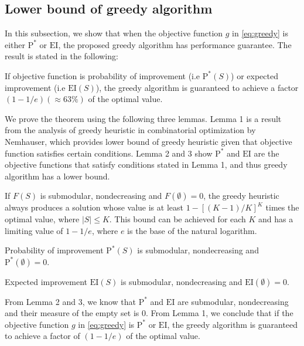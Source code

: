 \documentclass[opre,nonblindrev]{informs3} %
\newcommand{\EI}{\mathrm{EI}}
\newcommand{\PI}{\text{P}^*}
\begin{document}
\subsection{Lower bound of greedy algorithm}
In this subsection, we show that when the objective function $g$ in \eqref{eq:greedy} is either $\PI$ or $\EI$, the proposed greedy algorithm has performance guarantee. The result is stated in the following:
\begin{theorem} 
If objective function is probability of improvement (i.e $\PI(S)$) or expected improvement (i.e $\EI(S)$), the greedy algorithm is guaranteed to achieve a factor $(1-1/e) (\approx 63\%)$ of the optimal value.
\end{theorem}
We prove the theorem using the following three lemmas. Lemma 1 is a result from the analysis of greedy heuristic in combinatorial optimization by Nemhauser, which provides lower bound of greedy heuristic given that objective function satisfies certain conditions. Lemma 2 and 3 show $\PI$ and $\EI$ are the objective functions that satisfy conditions stated in Lemma 1, and thus greedy algorithm has a lower bound.
\begin{lemma} \citep{Company1978}
If $F(S)$ is submodular, nondecreasing and $F(\emptyset)=0$, the greedy heuristic always produces a solution whose value is at least $1-[(K-1)/K]^K$ times the optimal value, where $|S| \leq K$. This bound can be achieved for each $K$ and has a limiting value of $1-1/e$, where $e$ is the base of the natural logarithm.
\end{lemma}

\begin{lemma} 
  Probability of improvement $\PI(S)$ is submodular, nondecreasing and $\PI(\emptyset)=0$.
\end{lemma}
\begin{lemma}
  Expected improvement $\EI(S)$ is submodular, nondecreasing and $\EI(\emptyset)=0$.
\end{lemma}

From Lemma 2 and 3, we know that $\PI$ and $\EI$ are submodular, nondecreasing and their measure of the empty set is 0. From Lemma 1, we conclude that if the objective function $g$ in \eqref{eq:greedy} is $\PI$ or $\EI$, the greedy algorithm is guaranteed to achieve a factor of $(1-1/e)$ of the optimal value. \Halmos
\endproof
\end{document}
